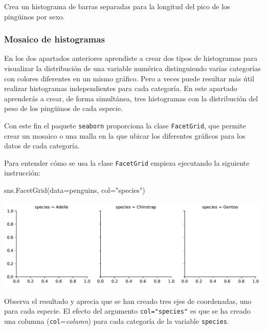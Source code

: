 \documentclass[
  a4paper,
  noprof,
  12pt,
  notoc,
  nosols,
  nobib]{mnye}
\newenvironment{Shaded}{\begin{snugshade}}{\end{snugshade}}
\newcommand{\NormalTok}[1]{\textcolor[rgb]{0.00,0.23,0.31}{#1}}
\newcommand{\OperatorTok}[1]{\textcolor[rgb]{0.37,0.37,0.37}{#1}}
\newcommand{\StringTok}[1]{\textcolor[rgb]{0.13,0.47,0.30}{#1}}
\renewenvironment{exercise}[1][]{
            \if\relax\detokenize{#1}\relax
                \ex
            \else
                \ex[note={#1}]
            \fi
        }{\endex}
\theoremstyle{definition}
\newtheorem{exercise}{Ejercicio}[section]
\theoremstyle{remark}
\begin{document}
\begin{exercise}[]%
\protect\hypertarget{exr-histogram-stack}{}\label{exr-histogram-stack}%
Crea un histograma de barras separadas para la longitud del pico de los
pingüinos por sexo.

\end{exercise}

\subsubsection{Mosaico de histogramas}\label{mosaico-de-histogramas}

En los dos apartados anteriores aprendiste a crear dos tipos de
histogramas para visualizar la distribución de una variable numérica
distinguiendo varias categorías con colores diferentes en un mismo
gráfico. Pero a veces puede resultar más útil realizar histogramas
independientes para cada categoría. En este apartado aprenderás a crear,
de forma simultánea, tres histogramas con la distribución del peso de
los pingüinos de cada especie.

Con este fin el paquete \texttt{seaborn} proporciona la clase
\texttt{FacetGrid}, que permite crear un mosaico o una malla en la que
ubicar los diferentes gráficos para los datos de cada categoría.

Para entender cómo se usa la clase \texttt{FacetGrid} empieza ejecutando
la siguiente instrucción:

\begin{Shaded}
\begin{Highlighting}[]
\NormalTok{sns.FacetGrid(data}\OperatorTok{=}\NormalTok{penguins, col}\OperatorTok{=}\StringTok{"species"}\NormalTok{)}
\end{Highlighting}
\end{Shaded}

\includegraphics{chapters/numerical_by_categorical_files/figure-pdf/cell-6-output-1.pdf}

Observa el resultado y aprecia que se han creado tres ejes de
coordenadas, uno para cada especie. El efecto del argumento
\texttt{col="species"} es que se ha creado una columna
(\texttt{col}=\emph{column}) para cada categoría de la variable
\texttt{species}.
\end{document}
